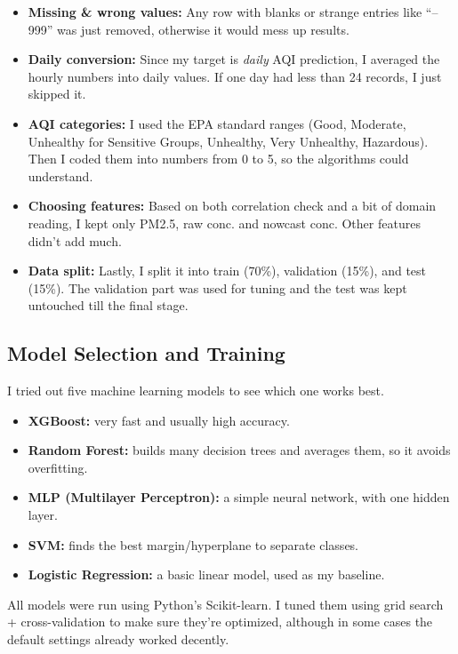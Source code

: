\documentclass[a4paper,fleqn]{cas-dc}
\begin{document}
\begin{itemize}
    \item \textbf{Missing \& wrong values:} Any row with blanks or strange entries like ``--999'' was just removed, otherwise it would mess up results.
    \item \textbf{Daily conversion:} Since my target is \textit{daily} AQI prediction, I averaged the hourly numbers into daily values. If one day had less than 24 records, I just skipped it.
    \item \textbf{AQI categories:} I used the EPA standard ranges (Good, Moderate, Unhealthy for Sensitive Groups, Unhealthy, Very Unhealthy, Hazardous). Then I coded them into numbers from 0 to 5, so the algorithms could understand.
    \item \textbf{Choosing features:} Based on both correlation check and a bit of domain reading, I kept only PM2.5, raw conc. and nowcast conc. Other features didn’t add much.
    \item \textbf{Data split:} Lastly, I split it into train (70\%), validation (15\%), and test (15\%). The validation part was used for tuning and the test was kept untouched till the final stage.
\end{itemize}

\subsection{Model Selection and Training}
I tried out five machine learning models to see which one works best.

\begin{itemize}
    \item \textbf{XGBoost:} very fast and usually high accuracy.
    \item \textbf{Random Forest:} builds many decision trees and averages them, so it avoids overfitting.
    \item \textbf{MLP (Multilayer Perceptron):} a simple neural network, with one hidden layer.
    \item \textbf{SVM:} finds the best margin/hyperplane to separate classes.
    \item \textbf{Logistic Regression:} a basic linear model, used as my baseline.
\end{itemize}

All models were run using Python’s Scikit-learn. I tuned them using grid search + cross-validation to make sure they’re optimized, although in some cases the default settings already worked decently.
\end{document}
